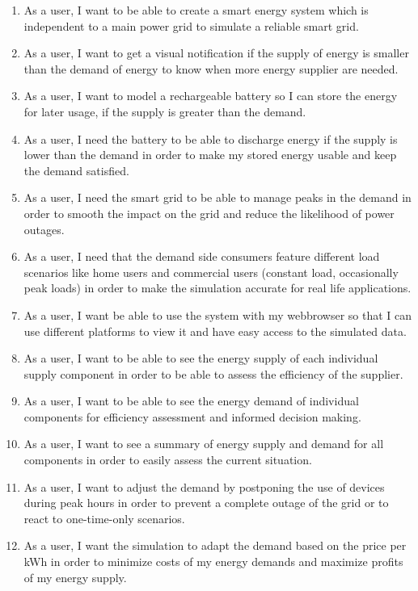 \begin{enumerate}
\item As a user, I want to be able to create a smart energy system which is independent to a main power grid to simulate a reliable smart grid.

\item As a user, I want to get a visual notification if the supply of energy is smaller than the demand of energy to know when more energy supplier are needed.


\item As a user, I want to model a rechargeable battery so I can store the energy for later usage, if the supply is greater than the demand.

\item As a user, I need the battery to be able to discharge energy if the supply is lower than the demand in order to make my stored energy usable and keep the demand satisfied.

\item As a user, I need the smart grid to be able to manage peaks in the demand in order to smooth the impact on the grid and reduce the likelihood of power outages.

\item As a user, I need that the demand side consumers feature different load scenarios like home users and commercial users (constant load, occasionally peak loads) in order to make the simulation accurate for real life applications.

\item As a user, I want be able to use the system with my webbrowser so that I can use different platforms to view it and have easy access to the simulated data.

\item As a user, I want to be able to see the energy supply of each individual supply component in order to be able to assess the efficiency of the supplier.

\item As a user, I want to be able to see the energy demand of individual components for efficiency assessment and informed decision making. 

\item As a user, I want to see a summary of energy supply and demand for all components in order to easily assess the current situation.

\item As a user, I want to adjust the demand by postponing the use of devices during peak hours in order to prevent a complete outage of the grid or to react to one-time-only scenarios.

\item As a user, I want the simulation to adapt the demand based on the price per kWh in order to minimize costs of my energy demands and maximize profits of my energy supply.

\end{enumerate}

